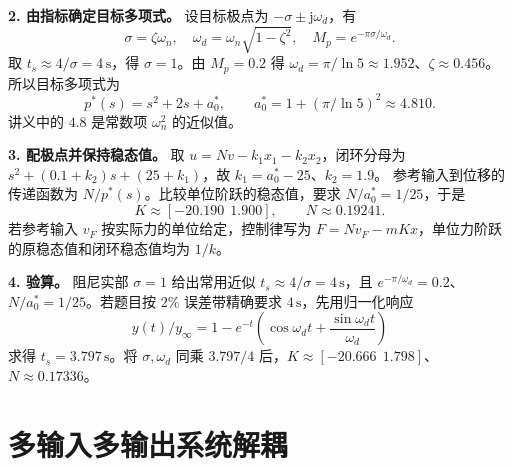 \textbf{2. 由指标确定目标多项式。}
设目标极点为 $-\sigma\pm\mathrm j\omega_d$，有
\[
    \sigma=\zeta\omega_n,\quad
    \omega_d=\omega_n\sqrt{1-\zeta^2},\quad
    M_p=e^{-\pi\sigma/\omega_d}.
\]
取 $t_s\approx 4/\sigma=4\,\mathrm{s}$，得 $\sigma=1$。由 $M_p=0.2$ 得 $\omega_d=\pi/\ln 5\approx1.952$、$\zeta\approx0.456$。所以目标多项式为
\[
    p^\ast(s)=s^2+2s+a_0^\ast,\qquad
    a_0^\ast=1+(\pi/\ln 5)^2\approx4.810 .
\]
讲义中的 $4.8$ 是常数项 $\omega_n^2$ 的近似值。

\textbf{3. 配极点并保持稳态值。}
取 $u=Nv-k_1x_1-k_2x_2$，闭环分母为 $s^2+(0.1+k_2)s+(25+k_1)$，故 $k_1=a_0^\ast-25$、$k_2=1.9$。
参考输入到位移的传递函数为 $N/p^\ast(s)$。比较单位阶跃的稳态值，要求 $N/a_0^\ast=1/25$，于是
\[
    \boxed{K\approx[-20.190\ \ 1.900],\qquad N\approx0.19241}.
\]
若参考输入 $v_F$ 按实际力的单位给定，控制律写为 $F=Nv_F-mKx$，单位力阶跃的原稳态值和闭环稳态值均为 $1/k$。

\textbf{4. 验算。} 阻尼实部 $\sigma=1$ 给出常用近似 $t_s\approx 4/\sigma=4\,\mathrm{s}$，且 $e^{-\pi/\omega_d}=0.2$、$N/a_0^\ast=1/25$。若题目按 $2\%$ 误差带精确要求 $4\,\mathrm{s}$，先用归一化响应
\[
    y(t)/y_\infty=1-e^{-t}\left(\cos\omega_dt+\frac{\sin\omega_dt}{\omega_d}\right)
\]
求得 $t_s=3.797\,\mathrm{s}$。将 $\sigma,\omega_d$ 同乘 $3.797/4$ 后，$K\approx[-20.666\ \ 1.798]$、$N\approx0.17336$。

\section{多输入多输出系统解耦}

